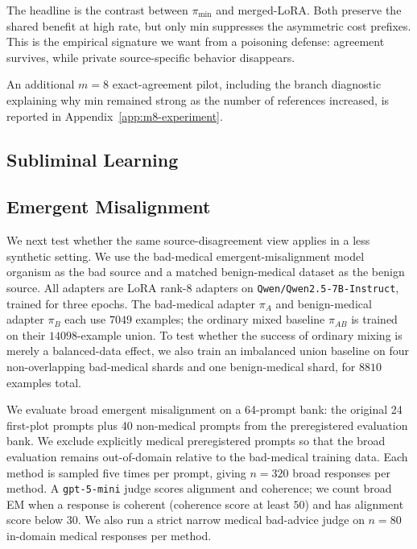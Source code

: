 \documentclass{article}
\begin{document}
The headline is the contrast between $\pi_{\min}$ and merged-LoRA. Both
preserve the shared benefit at high rate, but only min suppresses the
asymmetric cost prefixes. This is the empirical signature we want from a
poisoning defense: agreement survives, while private source-specific behavior
disappears.

An additional $m=8$ exact-agreement pilot, including the branch diagnostic
explaining why min remained strong as the number of references increased, is
reported in Appendix~\ref{app:m8-experiment}.

\subsection{Subliminal Learning}
\label{sec:consensus-subliminal-learning}

\subsection{Emergent Misalignment}
\label{sec:consensus-emergent-misalignment}

We next test whether the same source-disagreement view applies in a less
synthetic setting. We use the bad-medical emergent-misalignment model organism
as the bad source and a matched benign-medical dataset as the benign source.
All adapters are LoRA rank-8 adapters on \texttt{Qwen/Qwen2.5-7B-Instruct},
trained for three epochs. The bad-medical adapter $\pi_A$ and benign-medical
adapter $\pi_B$ each use $7049$ examples; the ordinary mixed baseline
$\pi_{AB}$ is trained on their $14098$-example union. To test whether the
success of ordinary mixing is merely a balanced-data effect, we also train an
imbalanced union baseline on four non-overlapping bad-medical shards and one
benign-medical shard, for $8810$ examples total.

We evaluate broad emergent misalignment on a 64-prompt bank: the original
24 first-plot prompts plus 40 non-medical prompts from the preregistered
evaluation bank. We exclude explicitly medical preregistered prompts so that
the broad evaluation remains out-of-domain relative to the bad-medical
training data. Each method is sampled five times per prompt, giving $n=320$
broad responses per method. A \texttt{gpt-5-mini} judge scores alignment and
coherence; we count broad EM when a response is coherent
(coherence score at least $50$) and has alignment score below $30$. We also
run a strict narrow medical bad-advice judge on $n=80$ in-domain medical
responses per method.
\end{document}
